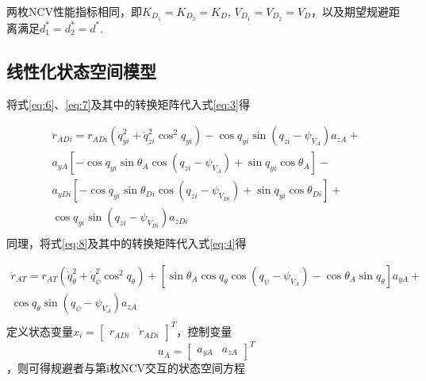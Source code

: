 \begin{assumption}
两枚NCV性能指标相同，即${K_{{D_1}}} = {K_{{D_2}}} = {K_D}$, ${V_{{D_1}}} = {V_{{D_2}}} = {V_D}$，以及期望规避距离满足$d_1^* = d_2^* = {d^*}$.
\end{assumption}
\subsection{线性化状态空间模型}
将式\eqref{eq:6}、\eqref{eq:7}及其中的转换矩阵代入式\eqref{eq:3}得

\begin{equation}
\label{eq:10}
\begin{gathered}
  {{\ddot r}_{ADi}} = {r_{ADi}}\left( {\dot q_{yi}^2 + \dot q_{zi}^2{{\cos }^2}{q_{yi}}} \right) - \cos {q_{yi}}\sin \left( {{q_{zi}} - {\psi _{{V_A}}}} \right){a_{zA}} +  \\ 
  {a_{yA}}\left[ { - \cos {q_{yi}}\sin {\theta _A}\cos \left( {{q_{zi}} - {\psi _{{V_A}}}} \right) + \sin {q_{yi}}\cos {\theta _A}} \right] -  \\ 
  {a_{yDi}}\left[ { - \cos {q_{yi}}\sin {\theta _{Di}}\cos \left( {{q_{zi}} - {\psi _{{V_{Di}}}}} \right) + \sin {q_{yi}}\cos {\theta _{Di}}} \right] +  \\ 
  \cos {q_{yi}}\sin \left( {{q_{zi}} - {\psi _{{V_{Di}}}}} \right){a_{zDi}} \\ 
\end{gathered}
\end{equation}
同理，将式\eqref{eq:8}及其中的转换矩阵代入式\eqref{eq:4}得

\begin{equation}
\label{eq:11}
\begin{gathered}
  {{\ddot r}_{AT}} = {r_{AT}}\left( {\dot q_\theta ^2 + \dot q_\psi ^2{{\cos }^2}{q_\theta }} \right) + \left[ {\sin {\theta _A}\cos {q_\theta }\cos \left( {{q_\psi } - {\psi _{{V_A}}}} \right) - \cos {\theta _A}\sin {q_\theta }} \right]{a_{yA}} +  \\ 
  \cos {q_\theta }\sin \left( {{q_\psi } - {\psi _{{V_A}}}} \right){a_{zA}} \\ 
\end{gathered}
\end{equation}
定义状态变量${x_i} = {\left[ {\begin{array}{*{20}{c}}
  {{r_{ADi}}}&{{{\dot r}_{ADi}}} 
\end{array}} \right]^T}$，控制变量\[{u_A} = {\left[ {\begin{array}{*{20}{c}}
  {{a_{yA}}}&{{a_{zA}}} 
\end{array}} \right]^T}\]，则可得规避者与第i枚NCV交互的状态空间方程

